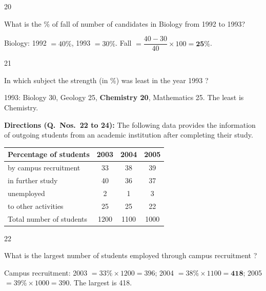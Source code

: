 \begin{question}{20}
{What is the \% of fall of number of candidates in Biology from 1992 to 1993?\par}
\begin{explain}
Biology: 1992 $=40\%$, 1993 $=30\%$. Fall $=\dfrac{40-30}{40}\times100=\mathbf{25\%}$.
\end{explain}
\end{question}

\begin{question}{21}
{In which subject the strength (in \%) was least in the year 1993 ?\par}
\begin{explain}
1993: Biology 30, Geology 25, \textbf{Chemistry 20}, Mathematics 25. The least is Chemistry.
\end{explain}
\end{question}

\begin{context}
\textbf{Directions (Q.~Nos.~22 to 24):} The following data provides the information of outgoing students from an academic institution after completing their study.
\begin{center}\small
\begin{tabular}{lccc}\toprule \textbf{Percentage of students} & \textbf{2003} & \textbf{2004} & \textbf{2005}\\\midrule
by campus recruitment & 33 & 38 & 39\\ in further study & 40 & 36 & 37\\ unemployed & 2 & 1 & 3\\ to other activities & 25 & 25 & 22\\\midrule
Total number of students & 1200 & 1100 & 1000\\\bottomrule
\end{tabular}
\end{center}
\end{context}
\begin{question}{22}
{What is the largest number of students employed through campus recruitment ?\par}
\begin{explain}
Campus recruitment: 2003 $=33\%\times1200=396$; 2004 $=38\%\times1100=\mathbf{418}$; 2005 $=39\%\times1000=390$. The largest is 418.
\end{explain}
\end{question}

